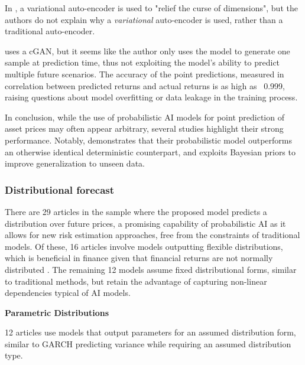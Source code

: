 In \textcite{li2020multivariate}, a variational auto-encoder is used to "relief the curse of dimensions", but the authors do not explain why a \textit{variational} auto-encoder is used, rather than a traditional auto-encoder.

\textcite{salama2024gan} uses a cGAN, but it seems like the author only uses the model to generate one sample at prediction time, thus not exploiting the model's ability to predict multiple future scenarios. The accuracy of the point predictions, measured in correlation between predicted returns and actual returns is as high as ~0.999, raising questions about model overfitting or data leakage in the training process.

In conclusion, while the use of probabilistic AI models for point prediction of asset prices may often appear arbitrary, several studies highlight their strong performance. Notably, \textcite{Daniali2021} demonstrates that their probabilistic model outperforms an otherwise identical deterministic counterpart, and \textcite{jang2018generative} exploits Bayesian priors to improve generalization to unseen data.

\subsubsection{Distributional forecast}
\label{sec:distribution}
There are 29 articles in the sample where the proposed model predicts a distribution over future prices, a promising capability of probabilistic AI as it allows for new risk estimation approaches, free from the constraints of traditional models. Of these, 16 articles involve models outputting flexible distributions, which is beneficial in finance given that financial returns are not normally distributed \textcite{Peir1994TheDO}. The remaining 12 models assume fixed distributional forms, similar to traditional methods, but retain the advantage of capturing non-linear dependencies typical of AI models.

\textbf{Parametric Distributions}

12 articles use models that output parameters for an assumed distribution form, similar to GARCH predicting variance while requiring an assumed distribution type.

